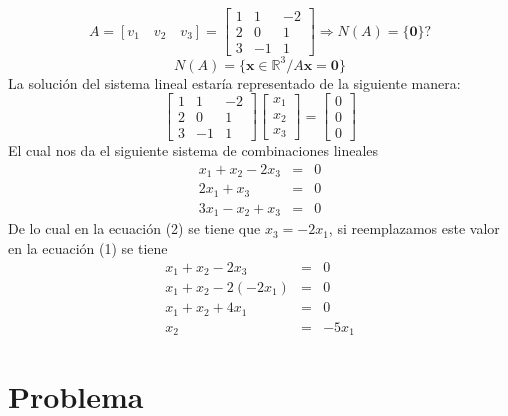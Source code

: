 \[
A = [ {v}_{1} \quad {v}_{2} \quad {v}_{3} ] =
\begin{bmatrix}
1 & 1 & -2 \\ 
2 & 0 & 1 \\
3 & -1 & 1
\end{bmatrix}
\Longrightarrow N(A) = \{ \mathbf{0} \} ?
\]
$$
N(A) = \{ \mathbf{x} \in \mathbb{R}^3 / A \mathbf{x} = \mathbf{0} \}
$$
La solución del sistema lineal estaría representado de la siguiente manera:
\[
\begin{bmatrix}
1 & 1 & -2 \\ 
2 & 0 & 1 \\
3 & -1 & 1
\end{bmatrix}
\begin{bmatrix}
{x}_{1} \\ 
{x}_{2} \\
{x}_{3}
\end{bmatrix} =
\begin{bmatrix}
0 \\ 
0 \\
0
\end{bmatrix}
\]
El cual nos da el siguiente sistema de combinaciones lineales
\setcounter{equation}{0}
\begin{eqnarray}
    {x}_{1} + {x}_{2} - 2{x}_{3} &=& 0 \\
    2{x}_{1} + {x}_{3} &=& 0 \\
    3{x}_{1} - {x}_{2} + {x}_{3} &=& 0
\end{eqnarray}
De lo cual en la ecuación (2) se tiene que ${x}_{3} = -2{x}_{1}$, si reemplazamos este valor en la ecuación (1) se tiene
\begin{eqnarray}
    {x}_{1} + {x}_{2} - 2{x}_{3} &=& 0 \nonumber \\
    {x}_{1} + {x}_{2} - 2(-2{x}_{1}) &=& 0 \nonumber \\
    {x}_{1} + {x}_{2} + 4{x}_{1} &=& 0 \nonumber \\
    {x}_{2} &=& -5{x}_{1} \nonumber
\end{eqnarray}
















\section{Problema}

